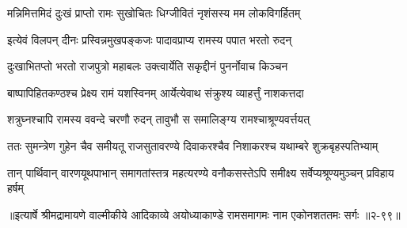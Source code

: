 \twolineshloka
{मन्निमित्तमिदं दुःखं प्राप्तो रामः सुखोचितः}
{धिग्जीवितं नृशंसस्य मम लोकविगर्हितम्} %

\twolineshloka
{इत्येवं विलपन् दीनः प्रस्विन्नमुखपङ्कजः}
{पादावप्राप्य रामस्य पपात भरतो रुदन्} %

\twolineshloka
{दुःखाभितप्तो भरतो राजपुत्रो महाबलः}
{उक्त्वार्येति सकृद्दीनं पुनर्नोवाच किञ्चन} %

\twolineshloka
{बाष्पापिहितकण्ठश्च प्रेक्ष्य रामं यशस्विनम्}
{आर्येत्येवाथ संक्रुश्य व्याहर्त्तुं नाशकत्तदा} %

\twolineshloka
{शत्रुघ्नश्चापि रामस्य ववन्दे चरणौ रुदन्}
{तावुभौ स समालिङ्ग्य रामश्चाश्रूण्यवर्त्तयत्} %

\twolineshloka
{ततः सुमन्त्रेण गुहेन चैव समीयतू राजसुतावरण्ये}
{दिवाकरश्चैव निशाकरश्च यथाम्बरे शुक्रबृहस्पतिभ्याम्} %

\twolineshloka
{तान् पार्थिवान् वारणयूथपाभान् समागतांस्तत्र महत्यरण्ये}
{वनौकसस्तेऽपि समीक्ष्य सर्वेप्यश्रूण्यमुञ्चन् प्रविहाय हर्षम्} %


॥इत्यार्षे श्रीमद्रामायणे वाल्मीकीये आदिकाव्ये अयोध्याकाण्डे रामसमागमः नाम एकोनशततमः सर्गः ॥२-९९॥
